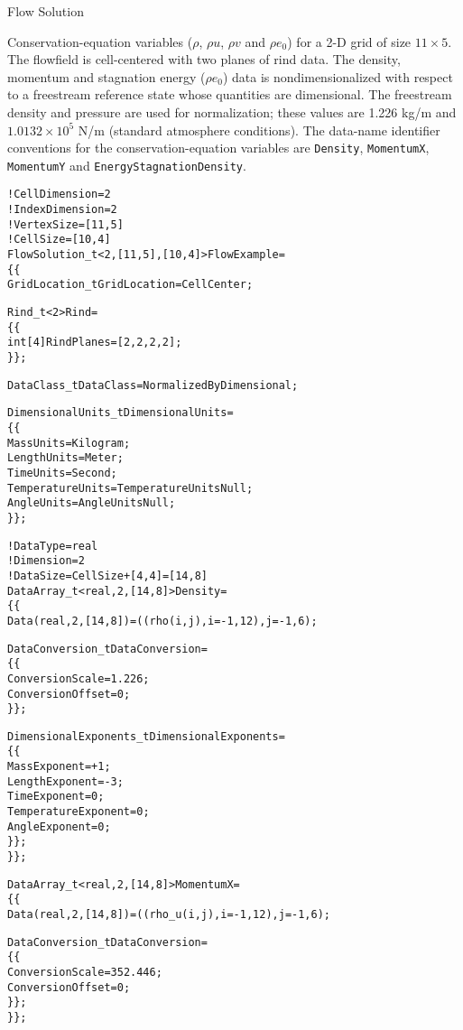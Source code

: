 \begin{example}{Flow Solution}
\label{ex:flow}

Conservation-equation variables ($\rho$, $\rho u$, $\rho v$ and
$\rho e_0$) for a 2-D grid of size $11\times5$.
The flowfield is cell-centered with two planes of rind data.
The density, momentum and stagnation energy ($\rho e_0$) data is
nondimensionalized with respect to a freestream reference state whose
quantities are dimensional.
The freestream density and pressure are used for normalization; these
values are 1.226 kg/m and $1.0132 \!\times\! 10^{5}$ N/m
(standard atmosphere conditions).
The data-name identifier conventions for the conservation-equation
variables are \texttt{Density}, \texttt{MomentumX}, \texttt{MomentumY} and
\texttt{EnergyStagnationDensity}.
\begin{alltt}
  !  CellDimension = 2
  !  IndexDimension = 2
  !  VertexSize = [11,5]
  !  CellSize = [10,4]
  FlowSolution\_t<2, [11,5], [10,4]> FlowExample =
    \{\{
    GridLocation\_t GridLocation = CellCenter ;

    Rind\_t<2> Rind =
      \{\{
      int[4] RindPlanes = [2,2,2,2] ;
      \}\} ;

    DataClass\_t DataClass = NormalizedByDimensional ;
    
    DimensionalUnits\_t DimensionalUnits = 
      \{\{ 
      MassUnits        = Kilogram ;
      LengthUnits      = Meter ;
      TimeUnits        = Second ;
      TemperatureUnits = TemperatureUnitsNull ;
      AngleUnits       = AngleUnitsNull ;
      \}\} ;

    !  DataType = real
    !  Dimension = 2
    !  DataSize = CellSize + [4,4] = [14,8]
    DataArray\_t<real, 2, [14,8]> Density =
      \{\{
      Data(real, 2, [14,8]) = ((rho(i,j), i=-1,12), j=-1,6) ;

      DataConversion\_t DataConversion =
        \{\{
        ConversionScale  = 1.226 ;
        ConversionOffset = 0 ;
        \}\} ;

      DimensionalExponents\_t DimensionalExponents =
        \{\{
        MassExponent        = +1 ;
        LengthExponent      = -3 ;
        TimeExponent        =  0 ;
        TemperatureExponent =  0 ;
        AngleExponent       =  0 ;
        \}\} ;
      \}\} ;

    DataArray\_t<real, 2, [14,8]> MomentumX =
      \{\{
      Data(real, 2, [14,8]) = ((rho\_u(i,j), i=-1,12), j=-1,6) ;

      DataConversion\_t DataConversion =
        \{\{
        ConversionScale  = 352.446 ;
        ConversionOffset = 0 ;
        \}\} ;
      \}\} ;


\end{alltt}
\end{example}
